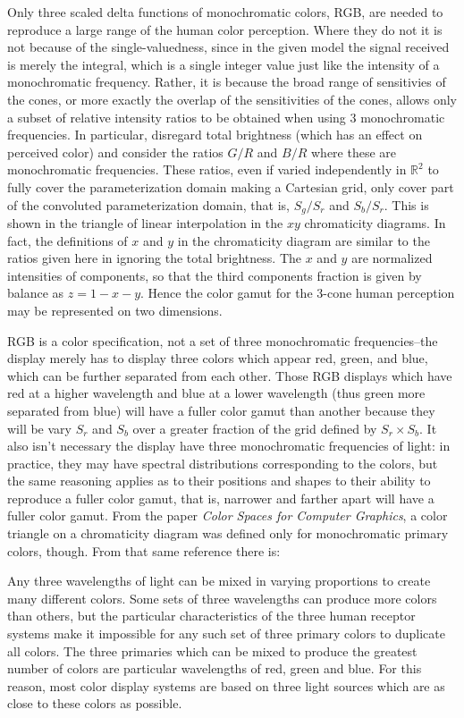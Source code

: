 \documentclass{article}
\begin{document}
Only three scaled delta functions of monochromatic colors, RGB, are needed to
reproduce a large range of the human color perception. Where they do not it is
not because of the single-valuedness, since in the given model the signal
received is merely the integral, which is a single integer value just like the
intensity of a monochromatic frequency. Rather, it is because the broad range
of sensitivies of the cones, or more exactly the overlap of the sensitivities
of the cones, allows only a subset of relative intensity ratios to be obtained
when using 3 monochromatic frequencies. In particular, disregard total
brightness (which has an effect on perceived color) and consider the
ratios $G/R$ and $B/R$ where these are monochromatic frequencies.  These
ratios, even if varied independently in $\mathbb{R}^2$ to fully cover the
parameterization domain making a Cartesian grid, only cover part of the
convoluted parameterization domain, that is, $S_g/S_r$ and $S_b/S_r$. This is
shown in the triangle of linear interpolation in the $xy$ chromaticity
diagrams. In fact, the definitions of $x$ and $y$ in the chromaticity diagram
are similar to the ratios given here in ignoring the total brightness. The $x$
and $y$ are normalized intensities of components, so that the third components
fraction is given by balance as $z = 1 - x - y$. Hence the color gamut for the
3-cone human perception may be represented on two dimensions.

RGB is a color specification, not a set of three monochromatic frequencies--the
display merely has to display three colors which appear red, green, and blue,
which can be further separated from each other. Those RGB displays which have
red at a higher wavelength and blue at a lower wavelength (thus green more
separated from blue) will have a fuller color gamut than another because they
will be vary $S_r$ and $S_b$ over a greater fraction of the grid defined by
$S_r \times S_b$. It also isn't necessary the display have three monochromatic
frequencies of light: in practice, they may have spectral distributions
corresponding to the colors, but the same reasoning applies as to their
positions and shapes to their ability to reproduce a fuller color gamut, that
is, narrower and farther apart will have a fuller color gamut. From the paper \emph{Color
Spaces for Computer Graphics}, a color triangle on a chromaticity diagram was
defined only for monochromatic primary colors, though. From that same reference
there is:

\begin{enquote}
Any three wavelengths of light can be mixed in varying proportions to create
many different colors. Some sets of three wavelengths can produce more colors
than others, but the particular characteristics of the three human receptor
systems make it impossible for any such set of three primary colors to
duplicate all colors. The three primaries which can be mixed to produce the
greatest number of colors are particular wavelengths of red, green and blue.
For this reason, most color display systems are based on three light sources
which are as close to these colors as possible.
\end{enquote}
\end{document}
